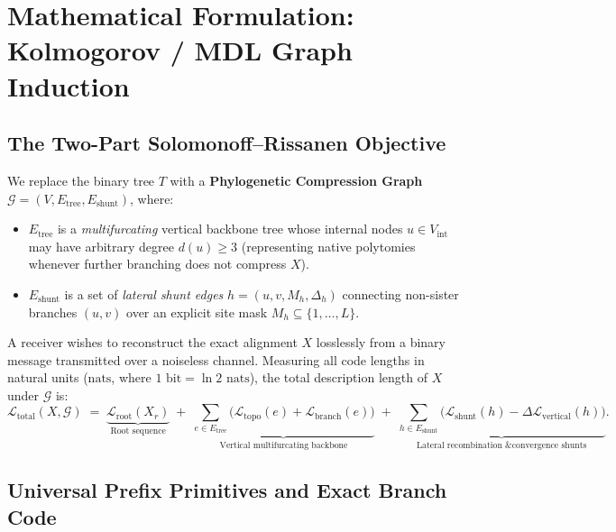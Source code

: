 \documentclass[11pt,a4paper]{article}
\begin{document}
\section{Mathematical Formulation: Kolmogorov / MDL Graph Induction}

\subsection{The Two-Part Solomonoff--Rissanen Objective}

We replace the binary tree $T$ with a \textbf{Phylogenetic Compression Graph} $\mathcal{G} = (V, E_{\text{tree}}, E_{\text{shunt}})$, where:
\begin{itemize}[leftmargin=1.8em]
    \item $E_{\text{tree}}$ is a \emph{multifurcating} vertical backbone tree whose internal nodes $u \in V_{\text{int}}$ may have arbitrary degree $d(u) \ge 3$ (representing native polytomies whenever further branching does not compress $X$).
    \item $E_{\text{shunt}}$ is a set of \emph{lateral shunt edges} $h = (u, v, M_h, \Delta_h)$ connecting non-sister branches $(u,v)$ over an explicit site mask $M_h \subseteq \{1, \dots, L\}$.
\end{itemize}

A receiver wishes to reconstruct the exact alignment $X$ losslessly from a binary message transmitted over a noiseless channel. Measuring all code lengths in natural units ($\text{nats}$, where $1\text{ bit} = \ln 2\text{ nats}$), the total description length of $X$ under $\mathcal{G}$ is:
\begin{equation}
    \mathcal{L}_{\text{total}}(X, \mathcal{G}) \;=\; \underbrace{\mathcal{L}_{\text{root}}(X_r)}_{\text{Root sequence}} \;+\; \underbrace{\sum_{e \in E_{\text{tree}}} \Big(\mathcal{L}_{\text{topo}}(e) + \mathcal{L}_{\text{branch}}(e)\Big)}_{\text{Vertical multifurcating backbone}} \;+\; \underbrace{\sum_{h \in E_{\text{shunt}}} \Big(\mathcal{L}_{\text{shunt}}(h) - \Delta\mathcal{L}_{\text{vertical}}(h)\Big)}_{\text{Lateral recombination \& convergence shunts}}.
    \label{eq:total_mdl}
\end{equation}

\subsection{Universal Prefix Primitives and Exact Branch Code}
\end{document}
